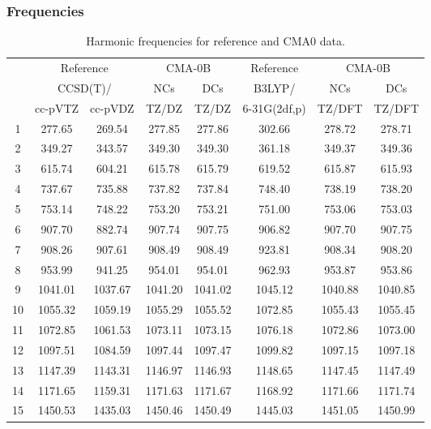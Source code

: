\documentclass[10pt,oneside]{article}
\begin{document}
\clearpage

\subsubsection*{Frequencies}
\begin{table}[h!]
\centering
\caption{Harmonic frequencies for reference and CMA0 data.}
\begin{tabular}{cccccccc}
\toprule
{} & \multicolumn{2}{c}{Reference} & \multicolumn{2}{c}{CMA-0B} &    Reference & \multicolumn{2}{c}{CMA-0B} \\
{} & \multicolumn{2}{c}{CCSD(T)/} &     NCs &     DCs &       B3LYP/ &     NCs &     DCs \\
{} &   cc-pVTZ & cc-pVDZ &   TZ/DZ &   TZ/DZ & 6-31G(2df,p) &  TZ/DFT &  TZ/DFT \\
\midrule
1  &    277.65 &  269.54 &  277.85 &  277.86 &       302.66 &  278.72 &  278.71 \\
2  &    349.27 &  343.57 &  349.30 &  349.30 &       361.18 &  349.37 &  349.36 \\
3  &    615.74 &  604.21 &  615.78 &  615.79 &       619.52 &  615.87 &  615.93 \\
4  &    737.67 &  735.88 &  737.82 &  737.84 &       748.40 &  738.19 &  738.20 \\
5  &    753.14 &  748.22 &  753.20 &  753.21 &       751.00 &  753.06 &  753.03 \\
6  &    907.70 &  882.74 &  907.74 &  907.75 &       906.82 &  907.70 &  907.75 \\
7  &    908.26 &  907.61 &  908.49 &  908.49 &       923.81 &  908.34 &  908.20 \\
8  &    953.99 &  941.25 &  954.01 &  954.01 &       962.93 &  953.87 &  953.86 \\
9  &   1041.01 & 1037.67 & 1041.20 & 1041.02 &      1045.12 & 1040.88 & 1040.85 \\
10 &   1055.32 & 1059.19 & 1055.29 & 1055.52 &      1072.85 & 1055.43 & 1055.45 \\
11 &   1072.85 & 1061.53 & 1073.11 & 1073.15 &      1076.18 & 1072.86 & 1073.00 \\
12 &   1097.51 & 1084.59 & 1097.44 & 1097.47 &      1099.82 & 1097.15 & 1097.18 \\
13 &   1147.39 & 1143.31 & 1146.97 & 1146.93 &      1148.65 & 1147.45 & 1147.49 \\
14 &   1171.65 & 1159.31 & 1171.63 & 1171.67 &      1168.92 & 1171.66 & 1171.74 \\
15 &   1450.53 & 1435.03 & 1450.46 & 1450.49 &      1445.03 & 1451.05 & 1450.99 \\

\end{tabular}
\end{table}
\end{document}
